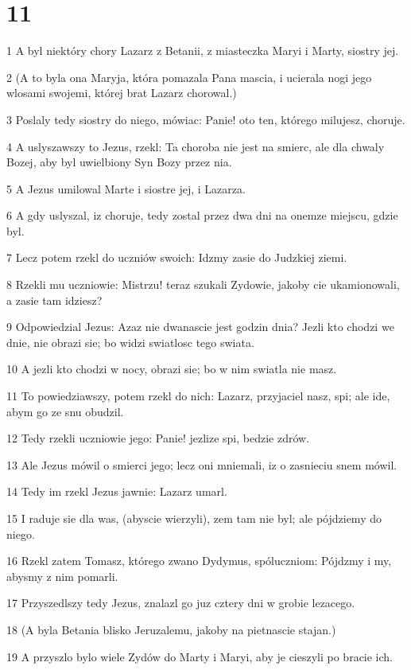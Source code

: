 \chapter{11}

\par 1 A byl niektóry chory Lazarz z Betanii, z miasteczka Maryi i Marty, siostry jej.
\par 2 (A to byla ona Maryja, która pomazala Pana mascia, i ucierala nogi jego wlosami swojemi, której brat Lazarz chorowal.)
\par 3 Poslaly tedy siostry do niego, mówiac: Panie! oto ten, którego milujesz, choruje.
\par 4 A uslyszawszy to Jezus, rzekl: Ta choroba nie jest na smierc, ale dla chwaly Bozej, aby byl uwielbiony Syn Bozy przez nia.
\par 5 A Jezus umilowal Marte i siostre jej, i Lazarza.
\par 6 A gdy uslyszal, iz choruje, tedy zostal przez dwa dni na onemze miejscu, gdzie byl.
\par 7 Lecz potem rzekl do uczniów swoich: Idzmy zasie do Judzkiej ziemi.
\par 8 Rzekli mu uczniowie: Mistrzu! teraz szukali Zydowie, jakoby cie ukamionowali, a zasie tam idziesz?
\par 9 Odpowiedzial Jezus: Azaz nie dwanascie jest godzin dnia? Jezli kto chodzi we dnie, nie obrazi sie; bo widzi swiatlosc tego swiata.
\par 10 A jezli kto chodzi w nocy, obrazi sie; bo w nim swiatla nie masz.
\par 11 To powiedziawszy, potem rzekl do nich: Lazarz, przyjaciel nasz, spi; ale ide, abym go ze snu obudzil.
\par 12 Tedy rzekli uczniowie jego: Panie! jezlize spi, bedzie zdrów.
\par 13 Ale Jezus mówil o smierci jego; lecz oni mniemali, iz o zasnieciu snem mówil.
\par 14 Tedy im rzekl Jezus jawnie: Lazarz umarl.
\par 15 I raduje sie dla was, (abyscie wierzyli), zem tam nie byl; ale pójdziemy do niego.
\par 16 Rzekl zatem Tomasz, którego zwano Dydymus, spóluczniom: Pójdzmy i my, abysmy z nim pomarli.
\par 17 Przyszedlszy tedy Jezus, znalazl go juz cztery dni w grobie lezacego.
\par 18 (A byla Betania blisko Jeruzalemu, jakoby na pietnascie stajan.)
\par 19 A przyszlo bylo wiele Zydów do Marty i Maryi, aby je cieszyli po bracie ich.

